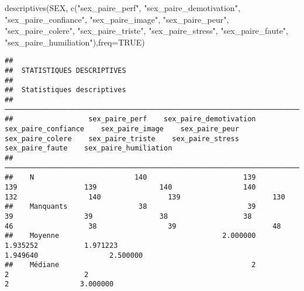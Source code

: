 \documentclass[
]{article}
\newenvironment{Shaded}{\begin{snugshade}}{\end{snugshade}}
\newcommand{\AttributeTok}[1]{\textcolor[rgb]{0.77,0.63,0.00}{#1}}
\newcommand{\ConstantTok}[1]{\textcolor[rgb]{0.00,0.00,0.00}{#1}}
\newcommand{\FunctionTok}[1]{\textcolor[rgb]{0.00,0.00,0.00}{#1}}
\newcommand{\NormalTok}[1]{#1}
\newcommand{\StringTok}[1]{\textcolor[rgb]{0.31,0.60,0.02}{#1}}
\begin{document}
\begin{Shaded}
\begin{Highlighting}[]
\FunctionTok{descriptives}\NormalTok{(SEX, }\FunctionTok{c}\NormalTok{(}\StringTok{"sex\_paire\_perf"}\NormalTok{, }\StringTok{"sex\_paire\_demotivation"}\NormalTok{, }\StringTok{"sex\_paire\_confiance"}\NormalTok{, }\StringTok{"sex\_paire\_image"}\NormalTok{, }\StringTok{"sex\_paire\_peur"}\NormalTok{, }\StringTok{"sex\_paire\_colere"}\NormalTok{, }\StringTok{"sex\_paire\_triste"}\NormalTok{, }\StringTok{"sex\_paire\_stress"}\NormalTok{, }\StringTok{"sex\_paire\_faute"}\NormalTok{, }\StringTok{"sex\_paire\_humiliation"}\NormalTok{),}\AttributeTok{freq=}\ConstantTok{TRUE}\NormalTok{)}
\end{Highlighting}
\end{Shaded}

\begin{verbatim}
## 
##  STATISTIQUES DESCRIPTIVES
## 
##  Statistiques descriptives                                                                                                                                                                                                      
##  ────────────────────────────────────────────────────────────────────────────────────────────────────────────────────────────────────────────────────────────────────────────────────────────────────────────────────────────── 
##                  sex_paire_perf    sex_paire_demotivation    sex_paire_confiance    sex_paire_image    sex_paire_peur    sex_paire_colere    sex_paire_triste    sex_paire_stress    sex_paire_faute    sex_paire_humiliation   
##  ────────────────────────────────────────────────────────────────────────────────────────────────────────────────────────────────────────────────────────────────────────────────────────────────────────────────────────────── 
##    N                        140                       139                    139                139               140                 140                 132                 140                139                      130   
##    Manquants                 38                        39                     39                 39                38                  38                  46                  38                 39                       48   
##    Moyenne                                       2.000000               1.935252           1.971223                                                                                         1.949640                 2.500000   
##    Médiane                                              2                      2                  2                                                                                                2                 3.000000   

\end{verbatim}
\end{document}
